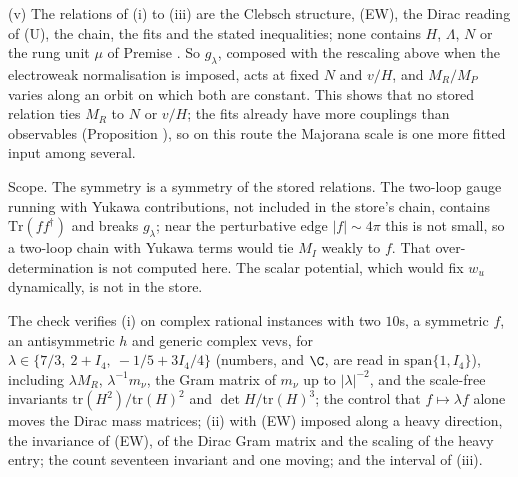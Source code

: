 (v) The relations of (i) to (iii) are the Clebsch structure, (EW), the Dirac reading of (U), the chain, the fits and the stated inequalities; none contains $H$, $\Lambda$, $N$ or the rung unit $\mu$ of Premise . So $g_{\lambda}$, composed with the rescaling above when the electroweak normalisation is imposed, acts at fixed $N$ and $v/H$, and $M_{R}/M_{P}$ varies along an orbit on which both are constant. This shows that no stored relation ties $M_{R}$ to $N$ or $v/H$; the fits already have more couplings than observables (Proposition ), so on this route the Majorana scale is one more fitted input among several.

Scope. The symmetry is a symmetry of the stored relations. The two-loop gauge running with Yukawa contributions, not included in the store's chain, contains $\mathrm{Tr}(ff^{\dagger})$ and breaks $g_{\lambda}$; near the perturbative edge $|f| \sim 4\pi$ this is not small, so a two-loop chain with Yukawa terms would tie $M_{I}$ weakly to $f$. That over-determination is not computed here. The scalar potential, which would fix $w_{u}$ dynamically, is not in the store.

The check verifies (i) on complex rational instances with two $10$s, a symmetric $f$, an antisymmetric $h$ and generic complex vevs, for $\lambda \in \{7/3,\ 2 + I_{4},\ -1/5 + 3I_{4}/4\}$ (numbers, and $\C$, are read in $\mathrm{span}\{1, I_{4}\}$), including $\lambda M_{R}$, $\lambda^{-1}m_{\nu}$, the Gram matrix of $m_{\nu}$ up to $|\lambda|^{-2}$, and the scale-free invariants $\mathrm{tr}(H^{2})/\mathrm{tr}(H)^{2}$ and $\det H/\mathrm{tr}(H)^{3}$; the control that $f \mapsto \lambda f$ alone moves the Dirac mass matrices; (ii) with (EW) imposed along a heavy direction, the invariance of (EW), of the Dirac Gram matrix and the scaling of the heavy entry; the count seventeen invariant and one moving; and the interval of (iii).
